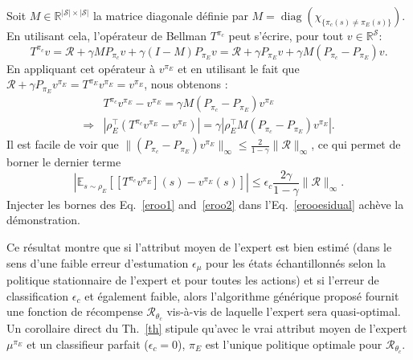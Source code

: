 \documentclass[french,utf8]{./hermes-journal}
\newcommand{\diag}{\operatorname*{diag}}
\newcommand{\R}{\mathcal{R}}
\newcommand{\s}{\mathcal{S}}
\newcommand{\E}{\mathbb{E}}
\begin{document}
\begin{proof*}
   Soit $M\in\mathbb{R}^{|\s|\times |\s|}$ la matrice diagonale définie par $M = \diag (\chi_{\{\pi_c(s)\neq\pi_E(s)\}})$. En utilisant cela, l'opérateur de Bellman $T^{\pi_c}$ peut s'écrire, pour tout $v\in\mathbb{R}^\s$:
  \begin{equation}
    T^{\pi_c}v = \R + \gamma M P_{\pi_c} v + \gamma (I-M)P_{\pi_E} v
    = \R + \gamma P_{\pi_E} v + \gamma M (P_{\pi_c}-P_{\pi_E})v.
  \end{equation}
  En appliquant cet opérateur à  $v^{\pi_E}$ et en utilisant le fait que $\R +
  \gamma P_{\pi_E} v^{\pi_E} = T^{\pi_E} v^{\pi_E} = v^{\pi_E}$, nous obtenons :
  \begin{align}
    &T^{\pi_c}v^{\pi_E} - v^{\pi_E} = \gamma M
    (P_{\pi_c}-P_{\pi_E})v^{\pi_E}
    \\\Rightarrow &|\rho_E^\top (T^{\pi_c}v^{\pi_E} - v^{\pi_E})| = \gamma
    |\rho_E^\top M (P_{\pi_c}-P_{\pi_E})v^{\pi_E}|.
  \end{align}
  Il est facile de voir que $\|(P_{\pi_c}-P_{\pi_E})v^{\pi_E}\|_\infty
  \leq \frac{2}{1-\gamma}\|\R\|_\infty$, ce qui permet de borner le dernier terme
  \begin{equation}
    |\E_{s\sim\rho_E}[[T^{\pi_c}v^{\pi_E}](s) - v^{\pi_E}(s)]| \leq
    \epsilon_c \frac{2\gamma}{1-\gamma} \|\R\|_\infty.
    \label{eroo2}
  \end{equation}
  Injecter les bornes des Eq.~\eqref{eroo1}
  and~\eqref{eroo2} dans l'Eq.~\eqref{erooesidual} achève la démonstration.%
\end{proof*}

Ce résultat montre que si l'attribut moyen de l'expert est bien estimé (dans le sens d'une faible erreur d'estumation $\epsilon_\mu$ pour les états échantillonnés selon la politique stationnaire de l'expert et pour toutes les actions) et si l'erreur de classification $\epsilon_c$ et également faible, alors l'algorithme générique proposé fournit une fonction de récompense 
$\R_{\theta_c}$ vis-à-vis de laquelle l'expert sera quasi-optimal. Un corollaire direct du Th.~\ref{th} stipule qu'avec le vrai attribut moyen de l'expert $\mu^{\pi_E}$ et un classifieur parfait 
($\epsilon_c=0$), $\pi_E$ est l'unique politique optimale pour 
$\R_{\theta_c}$.
\end{document}
